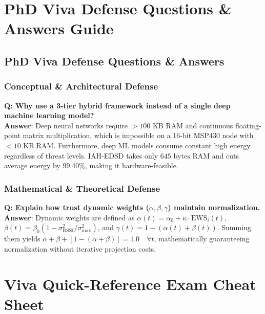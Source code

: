 \documentclass[11pt,a4paper,oneside]{book}
\begin{document}
\part{PhD Viva Defense Questions \& Answers Guide}

\chapter{PhD Viva Defense Questions \& Answers}

\section{Conceptual \& Architectural Defense}
\textbf{Q: Why use a 3-tier hybrid framework instead of a single deep machine learning model?}\\
\textbf{Answer}: Deep neural networks require $>100\text{ KB}$ RAM and continuous floating-point matrix multiplication, which is impossible on a 16-bit MSP430 node with $<10\text{ KB}$ RAM. Furthermore, deep ML models consume constant high energy regardless of threat levels. IAH-EDSD takes only $645\text{ bytes}$ RAM and cuts average energy by $99.40\%$, making it hardware-feasible.

\section{Mathematical \& Theoretical Defense}
\textbf{Q: Explain how trust dynamic weights ($\alpha, \beta, \gamma$) maintain normalization.}\\
\textbf{Answer}: Dynamic weights are defined as $\alpha(t) = \alpha_0 + \kappa \cdot \text{EWS}_i(t)$, $\beta(t) = \beta_0 (1 - \sigma_{\text{RSSI}}^2 / \sigma_{\text{max}}^2)$, and $\gamma(t) = 1 - (\alpha(t) + \beta(t))$. Summing them yields $\alpha + \beta + [1 - (\alpha + \beta)] = 1.0 \quad \forall t$, mathematically guaranteeing normalization without iterative projection costs.

\part{Viva Quick-Reference Exam Cheat Sheet}
\end{document}
